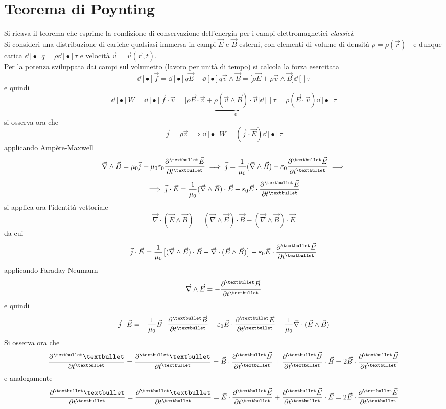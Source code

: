 \section{Teorema di Poynting}
Si ricava il teorema che esprime la condizione di conservazione dell'energia per i campi elettromagnetici \textit{classici}. 
\\Si consideri una distribuzione di cariche qualsiasi immersa in campi $\vec{E}$ e $\vec{B}$ esterni, con elementi di volume di densità $\rho = \rho(\vec{r})$ - e dunque carica $\dd[•]{q} = \rho \dd[•]{\tau}$ e velocità $\vec{v} = \vec{v}(\vec{r}, t)$.
\\Per la potenza sviluppata dai campi sul volumetto (lavoro per unità di tempo) si calcola la forza esercitata
\[\dd[•]{\vec{f}} = \dd[•]{q} \vec{E} + \dd[•]{q} \vec{v} \wedge \vec{B} = \big[\rho \vec{E} + \rho \vec{v} \wedge \vec{B}\big] \dd[]{\tau}\]
e quindi
\[\dd[•]{W} = \dd[•]{\vec{f}} \cdot \vec{v} = \big[\rho \vec{E} \cdot \vec{v} + \underbrace{\rho (\vec{v} \wedge \vec{B}) \cdot \vec{v}}_{0} \big] \dd[]{\tau} = \rho (\vec{E} \cdot \vec{v}) \dd[•]{\tau}\]
si osserva ora che
\[\vec{j} = \rho \vec{v} \implies \dd[•]{W} = (\vec{j} \cdot \vec{E}) \dd[•]{\tau}\]
applicando Ampère-Maxwell
\[\vec{\nabla} \wedge \vec{B} = \mu_0 \vec{j} + \mu_0 \varepsilon_0 \pdv[•]{\vec{E}}{t} \implies \vec{j} = \frac{1}{\mu_0} (\vec{\nabla} \wedge \vec{B}) - \varepsilon_0 \pdv[•]{\vec{E}}{t} \implies\]
\[\implies \vec{j} \cdot \vec{E} = \frac{1}{\mu_0} (\vec{\nabla} \wedge \vec{B}) \cdot \vec{E} - \varepsilon_0 \vec{E} \cdot \pdv[•]{\vec{E}}{t} \]
si applica ora l'identità vettoriale
\[\vec{\nabla} \cdot (\vec{E} \wedge \vec{B}) = (\vec{\nabla} \wedge \vec{E}) \cdot \vec{B} - (\vec{\nabla} \wedge \vec{B}) \cdot \vec{E}\]
da cui
\[\vec{j} \cdot \vec{E} = \frac{1}{\mu_0} \big[ (\vec{\nabla} \wedge \vec{E}) \cdot \vec{B} - \vec{\nabla} \cdot (\vec{E} \wedge \vec{B}) \big] - \varepsilon_0 \vec{E} \cdot \pdv[•]{\vec{E}}{t}\]
applicando Faraday-Neumann
\[\vec{\nabla} \wedge \vec{E} = - \pdv[•]{\vec{B}}{t}\]
e quindi
\[\vec{j} \cdot \vec{E} = - \frac{1}{\mu_0} \vec{B} \cdot \pdv[•]{\vec{B}}{t} - \varepsilon_0 \vec{E} \cdot \pdv[•]{\vec{E}}{t} - \frac{1}{\mu_0} \vec{\nabla} \cdot (\vec{E} \wedge \vec{B})\]
Si osserva ora che
\[\pdv[•]{•}{t}(B^2) = \pdv[•]{•}{t}(\vec{B} \cdot \vec{B}) = \vec{B} \cdot \pdv[•]{\vec{B}}{t} + \pdv[•]{\vec{B}}{t} \cdot \vec{B} = 2 \vec{B} \cdot \pdv[•]{\vec{B}}{t}\]
e analogamente
\[\pdv[•]{•}{t}(E^2) = \pdv[•]{•}{t}(\vec{E} \cdot \vec{E}) = \vec{E} \cdot \pdv[•]{\vec{E}}{t} + \pdv[•]{\vec{E}}{t} \cdot \vec{E} = 2 \vec{E} \cdot \pdv[•]{\vec{E}}{t}\]

